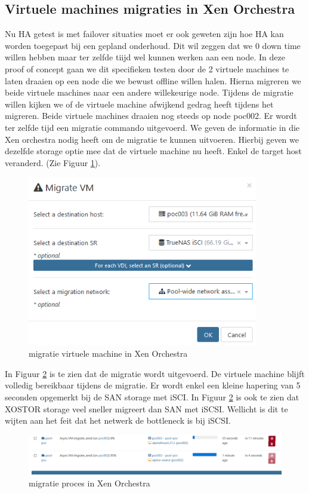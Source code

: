 \subsection{Virtuele machines migraties in Xen Orchestra}%
Nu HA getest is met failover situaties moet er ook geweten zijn hoe HA kan worden toegepast bij een gepland onderhoud. Dit wil zeggen dat we 0 down time willen hebben maar ter zelfde tiijd wel kunnen werken aan een node.
In deze proof of concept gaan we dit specifieken testen door de 2 virtuele machines te laten draaien op een node die we bewust offline willen halen.
Hierna migreren we beide virtuele machines naar een andere willekeurige node. Tijdens de migratie willen kijken we of de virtuele machine afwijkend gedrag heeft tijdens het migreren. 
Beide virtuele machines draaien nog steeds op node poc002. Er wordt ter zelfde tijd een migratie commando uitgevoerd.
We geven de informatie in die Xen orchestra nodig heeft om de migratie te kunnen uitvoeren. Hierbij geven we dezelfde storage optie mee dat de virtuele machine nu heeft. Enkel de target host veranderd. (Zie Figuur \ref{fig:migratie-vm-orch}).
\begin{figure}[H]
  \centering
  \hspace*{-1cm}  
  \includegraphics[width=0.9\textwidth]{../poc/migratie-vm-orch.png}
  \caption{migratie virtuele machine in Xen Orchestra}
  \label{fig:migratie-vm-orch}
\end{figure}
In Figuur \ref{fig:migratie-proces-orch} is te zien dat de migratie wordt uitgevoerd. De virtuele machine blijft volledig bereikbaar tijdens de migratie. Er wordt enkel een kleine hapering van 5 seconden opgemerkt bij de SAN storage met iSCI.
In Figuur \ref{fig:migratie-proces-orch} is ook te zien dat XOSTOR storage veel sneller migreert dan SAN met iSCSI. Wellicht is dit te wijten aan het feit dat het netwerk de bottleneck is bij iSCSI.
\begin{figure}[H]
  \centering
  \includegraphics[width=1.1\textwidth]{../poc/migratie-proces-orch.png}
  \caption{migratie proces in Xen Orchestra}
  \label{fig:migratie-proces-orch}  
\end{figure}

